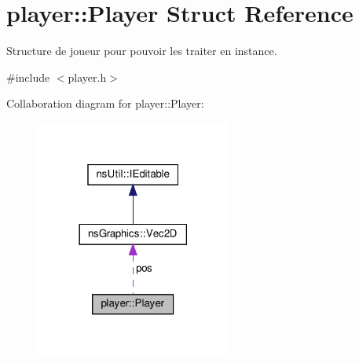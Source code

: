 \hypertarget{structplayer_1_1_player}{}\section{player\+:\+:Player Struct Reference}
\label{structplayer_1_1_player}


Structure de joueur pour pouvoir les traiter en instance.  




{\ttfamily \#include $<$player.\+h$>$}



Collaboration diagram for player\+:\+:Player\+:
\nopagebreak
\begin{figure}[H]
\begin{center}
\leavevmode
\includegraphics[width=182pt]{structplayer_1_1_player__coll__graph}
\end{center}
\end{figure}
